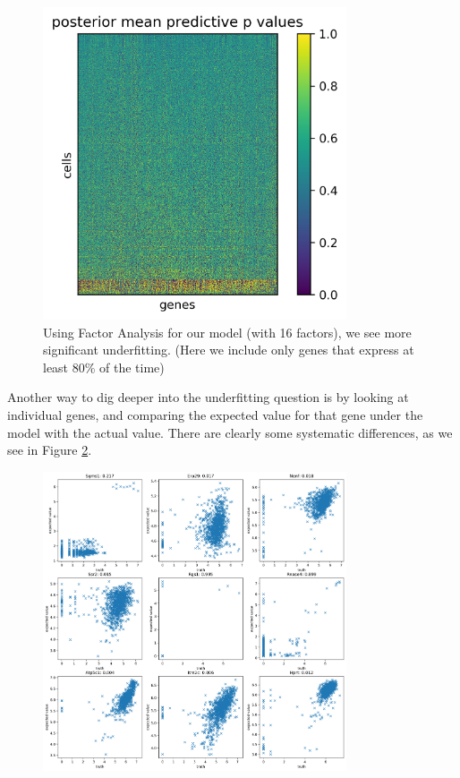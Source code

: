 \begin{figure}
\includegraphics[width=0.8\textwidth]{pics/residslesszerosFA}
\caption{Using Factor Analysis for our model (with 16 factors), we see more significant underfitting.  (Here we include only genes that express at least 80\% of the time)\label{fig:residslesszerosFA}}
\end{figure}

Another way to dig deeper into the underfitting question is by looking at individual genes, and comparing the expected value for that gene under the model with the actual value.  There are clearly some systematic differences, as we see in Figure \ref{fig:residsdetail}.

\begin{figure}
\includegraphics[width=0.8\textwidth]{pics/residsdetail}
\caption{\label{fig:residsdetail}}
\end{figure}

